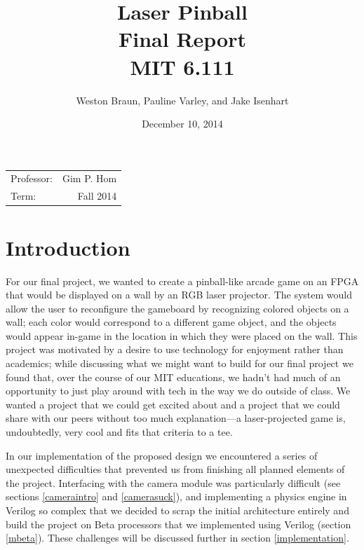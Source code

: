 \documentclass{article}
\title{\vspace{6cm}Laser Pinball \\ Final Report \\\vspace{1cm} MIT 6.111} %
\author{Weston Braun, Pauline Varley, and Jake Isenhart} %
\date{December 10, 2014} %
\begin{document}
\maketitle %
\vspace{8cm}
\begin{center}
\begin{tabular}{l r}
Professor: & Gim P. Hom \\
Term: & Fall 2014
\end{tabular}
\end{center}

\pagebreak

\tableofcontents

\pagebreak


\section{Introduction} \label{intro}

For our final project, we wanted to create a pinball-like arcade game on an FPGA that would be displayed on a wall by an RGB laser projector. The system would allow the user to reconfigure the gameboard by recognizing colored objects on a wall; each color would correspond to a different game object, and the objects would appear in-game in the location in which they were placed on the wall. This project was motivated by a desire to use technology for enjoyment rather than academics; while discussing what we might want to build for our final project we found that, over the course of our MIT educations, we hadn't had much of an opportunity to just play around with tech in the way we do outside of class. We wanted a project that we could get excited about and a project that we could share with our peers without too much explanation—a laser-projected game is, undoubtedly, very cool and fits that criteria to a tee.

In our implementation of the proposed design we encountered a series of unexpected difficulties that prevented us from finishing all planned elements of the project. Interfacing with the camera module was particularly difficult (see sections \ref{cameraintro} and \ref{camerasuck}), and implementing a physics engine in Verilog so complex that we decided to scrap the initial architecture entirely and build the project on Beta processors that we implemented using Verilog (section \ref{mbeta}). These challenges will be discussed further in section \ref{implementation}.
\end{document}
